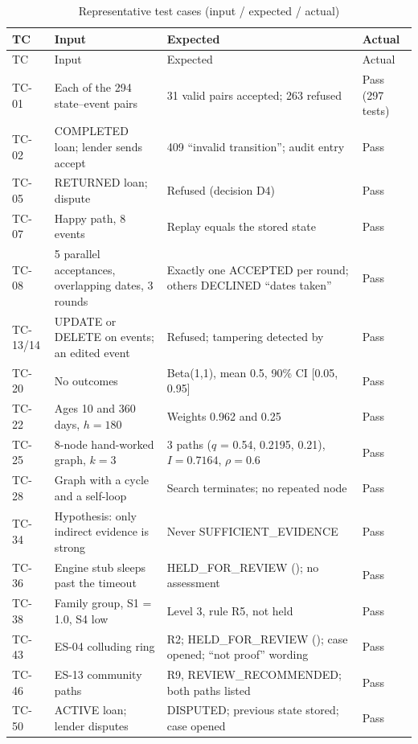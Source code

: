 \begingroup
\begin{longtable}{@{}L{26pt}L{111pt}L{158pt}L{64pt}@{}}
\caption{Representative test cases (input / expected / actual)}\label{tab:representative-test-cases-input}\\
\toprule
TC & Input & Expected & Actual \\
\midrule
\endfirsthead
\toprule
TC & Input & Expected & Actual \\
\midrule
\endhead
\bottomrule
\endlastfoot
TC-01 & Each of the 294 state--event pairs & 31 valid pairs accepted; 263 refused & Pass (297 tests) \\
TC-02 & COMPLETED loan; lender sends accept & 409 ``invalid transition''; audit entry & Pass \\
TC-05 & RETURNED loan; dispute & Refused (decision D4) & Pass \\
TC-07 & Happy path, 8 events & Replay equals the stored state & Pass \\
TC-08 & 5 parallel acceptances, overlapping dates, 3 rounds & Exactly one ACCEPTED per round; others DECLINED ``dates taken'' & Pass \\
TC-13/14 & UPDATE or DELETE on events; an edited event & Refused; tampering detected by  & Pass \\
TC-20 & No outcomes & Beta(1,1), mean 0.5, 90\% CI [0.05, 0.95] & Pass \\
TC-22 & Ages 10 and 360 days, $h = 180$ & Weights 0.962 and 0.25 & Pass \\
TC-25 & 8-node hand-worked graph, $k=3$ & 3 paths ($q$ = 0.54, 0.2195, 0.21), $I = 0.7164$, $\rho = 0.6$ & Pass \\
TC-28 & Graph with a cycle and a self-loop & Search terminates; no repeated node & Pass \\
TC-34 & Hypothesis: only indirect evidence is strong & Never SUFFICIENT\_EVIDENCE & Pass \\
TC-36 & Engine stub sleeps past the timeout & HELD\_FOR\_REVIEW (); no assessment & Pass \\
TC-38 & Family group, S1 = 1.0, S4 low & Level 3, rule R5, not held & Pass \\
TC-43 & ES-04 colluding ring & R2; HELD\_FOR\_REVIEW (); case opened; ``not proof'' wording & Pass \\
TC-46 & ES-13 community paths & R9, REVIEW\_RECOMMENDED; both paths listed & Pass \\
TC-50 & ACTIVE loan; lender disputes & DISPUTED; previous state stored; case opened & Pass \\

\end{longtable}
